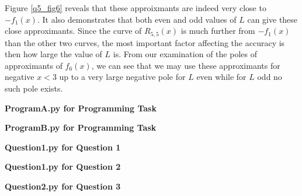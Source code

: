 \documentclass[12pt, a4paper]{article}
\begin{document}
Figure \ref{q5_fig6} reveals that these approixmants are indeed very close
to $-f_{1}(x)$. It also demonstrates that both even and odd values of $L$
can give these close approximants. Since the curve of $R_{5,5}(x)$ is much 
further from $-f_{1}(x)$ than the other two curves, the most important
factor affecting the accuracy is then how large the value of $L$ is.
From our examination of the poles of approximants of $f_{6}(x)$, we can 
see that we may use these approximants for negative $x<3$ up to a very 
large negative pole for $L$ even while for $L$ odd no such pole exists.



\pagebreak
\textbf{Program\textunderscore A.py for Programming Task}\centering\label{Program_A}

\vspace{2cm}

\pagebreak
\textbf{Program\textunderscore B.py for Programming Task}\centering\label{Program_B}

\vspace{2cm}

\pagebreak
\textbf{Question\textunderscore 1.py for Question 1}\centering\label{Question_1}

\vspace{2cm}

\pagebreak
\textbf{Question\textunderscore 1.py for Question 2}\centering\label{Question_2}

\vspace{2cm}

\pagebreak
\textbf{Question\textunderscore 2.py for Question 3}\centering\label{Question_3}

\vspace{2cm}
\end{document}
